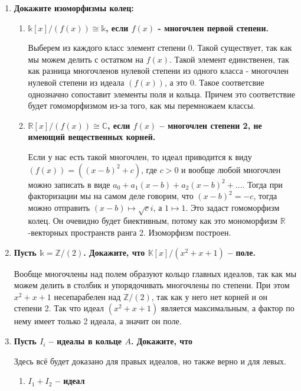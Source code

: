 \documentclass{article}
\begin{document}
\begin{enumerate}
    \item \textbf{Докажите изоморфизмы колец:}
    \begin{enumerate}
        \item \textbf{$\mathbb{k}[x]/(f(x))\cong\mathbb{k}$, если $f(x)$ -
            многочлен первой степени.}

\vspace{2ex}
            Выберем из каждого класс элемент степени 0. Такой существует, так
            как мы можем делить с остатком на $f(x)$. Такой элемент единственен,
            так как разница многочленов нулевой степени из одного класса -
            многочлен нулевой степени из идеала $(f(x))$, а это 0.
            Такое соответсвие однозначно сопоставит элементы поля и кольца.
            Причем это соответствие будет гомоморфизмом из-за того, как мы
            перемножаем классы. 

        \item \textbf{$\mathbb{R}[x]/(f(x))\cong\mathbb{C}$, если $f(x)$ –
            многочлен степени 2, не имеющий вещественных корней.}

            Если у нас есть такой многочлен, то идеал приводится к виду $(f(x))=
            ((x-b)^2+c)$, где $c>0$ и вообще любой многочлен можно записать в виде
            $a_0+a_1(x-b)+a_2(x-b)^2+\ldots$. Тогда при факторизации мы на самом
            деле говорим, что $(x-b)^2=-c$, тогда можно отправить $(x-b)\mapsto
            \sqrt ci$, а $1\mapsto 1$. Это задаст гомоморфизм колец. Он очевидно
            будет биективным, потому как это мономорфизм $\mathbb{R}$-векторных
            пространств ранга 2. Изоморфизм построен.
    \end{enumerate}
    
    \item \textbf{Пусть $\mathbb{k}=\mathbb{Z}/(2)$. Докажите, что $\mathbb{K}
        [x]/(x^2+x+1)$ – поле.}

        Вообще многочлены над полем образуют кольцо главных идеалов, так как
        мы можем делить в столбик и упорядочивать многочлены по степени. При
        этом $x^2+x+1$ несепарабелен над $\mathbb{Z}/(2)$, так как у него нет
        корней и он степени 2. Так что идеал $(x^2+x+1)$ является максимальным,
        а фактор по нему имеет только 2 идеала, а значит он поле.

    \item \textbf{Пусть $I_i$ – идеалы в кольце $A$. Докажите, что}

        Здесь всё будет доказано для правых идеалов, но также верно и для левых.
    \begin{enumerate}
        \item \textbf{$I_1+I_2$ – идеал}


\end{enumerate}
\end{enumerate}
\end{document}
